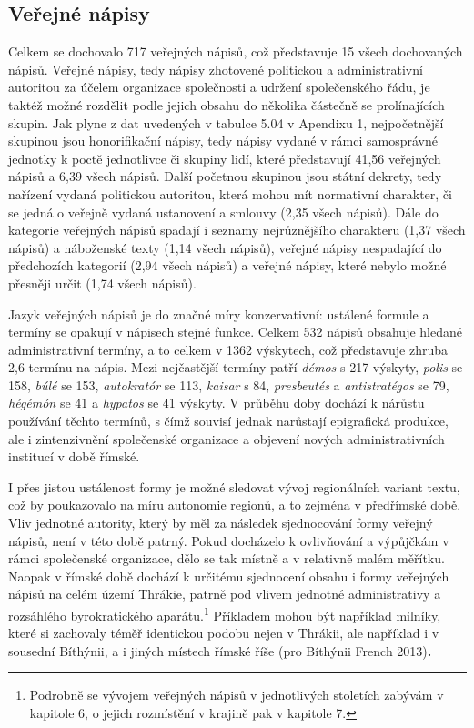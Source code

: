 
\subsection[veřejné-nápisy]{Veřejné nápisy}

Celkem se dochovalo 717 veřejných nápisů, což představuje 15  všech dochovaných nápisů. Veřejné nápisy, tedy nápisy zhotovené politickou a administrativní autoritou za účelem organizace společnosti a udržení společenského řádu, je taktéž možné rozdělit podle jejich obsahu do několika částečně se prolínajících skupin. Jak plyne z dat uvedených v tabulce 5.04 v Apendixu 1, nejpočetnější skupinou jsou honorifikační nápisy, tedy nápisy vydané v rámci samosprávné jednotky k poctě jednotlivce či skupiny lidí, které představují 41,56  veřejných nápisů a 6,39  všech nápisů. Další početnou skupinou jsou státní dekrety, tedy nařízení vydaná politickou autoritou, která mohou mít normativní charakter, či se jedná o veřejně vydaná ustanovení a smlouvy (2,35  všech nápisů). Dále do kategorie veřejných nápisů spadají i seznamy nejrůznějšího charakteru (1,37  všech nápisů) a náboženské texty (1,14  všech nápisů), veřejné nápisy nespadající do předchozích kategorií (2,94  všech nápisů) a veřejné nápisy, které nebylo možné přesněji určit (1,74  všech nápisů).

Jazyk veřejných nápisů je do značné míry konzervativní: ustálené formule a termíny se opakují v nápisech stejné funkce. Celkem 532 nápisů obsahuje hledané administrativní termíny, a to celkem v 1362 výskytech, což představuje zhruba 2,6 termínu na nápis. Mezi nejčastější termíny patří {\em démos} s 217 výskyty, {\em polis} se 158, {\em búlé} se 153, {\em autokratór} se 113, {\em kaisar} s 84, {\em presbeutés} a {\em antistratégos} se 79, {\em hégémón} se 41 a {\em hypatos} se 41 výskyty. V průběhu doby dochází k nárůstu používání těchto termínů, s čímž souvisí jednak narůstají epigrafická produkce, ale i zintenzivnění společenské organizace a objevení nových administrativních institucí v době římské.

I přes jistou ustálenost formy je možné sledovat vývoj regionálních variant textu, což by poukazovalo na míru autonomie regionů, a to zejména v předřímské době. Vliv jednotné autority, který by měl za následek sjednocování formy veřejný nápisů, není v této době patrný. Pokud docházelo k ovlivňování a výpůjčkám v rámci společenské organizace, dělo se tak místně a v relativně malém měřítku. Naopak v římské době dochází k určitému sjednocení obsahu i formy veřejných nápisů na celém území Thrákie, patrně pod vlivem jednotné administrativy a rozsáhlého byrokratického aparátu.\footnote{Podrobně se vývojem veřejných nápisů v jednotlivých stoletích zabývám v kapitole 6, o jejich rozmístění v krajině pak v kapitole 7.} Příkladem mohou být například milníky, které si zachovaly téměř identickou podobu nejen v Thrákii, ale například i v sousední Bíthýnii, a i jiných místech římské říše (pro Bíthýnii French 2013){\bf .}

